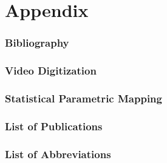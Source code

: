 \documentclass[12pt,a4paper,twoside]{report}
\newcommand\cleartorightpage{%
\clearpage
\hbox{}
}
\newcommand\chng[1]{{\color{darkgreen}#1}}
\begin{document}
\cleartorightpage
\part{Appendix}\label{acknowledgements}

\addtocounter{chapter}{+1}
\setcounter{section}{0}

\singlespacing
\section{Bibliography}
\renewcommand{\bibname}{}
\makeatletter
\renewcommand{\chapter}{\@gobbletwo}
\makeatother



\clearpage
\section{Video Digitization}\label{cpt:digitization}


\clearpage
\section{Statistical Parametric Mapping}\label{cpt:spm1d}


\clearpage
\section{\chng{List of Publications}}\label{cpt:publications}



\clearpage
\section{List of Abbreviations}\label{abbreviations}
\begin{spacing}{1.5}

\end{spacing}
\end{document}
